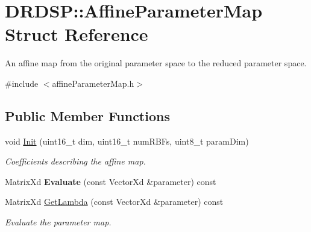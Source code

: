 \hypertarget{struct_d_r_d_s_p_1_1_affine_parameter_map}{\section{D\-R\-D\-S\-P\-:\-:Affine\-Parameter\-Map Struct Reference}
\label{struct_d_r_d_s_p_1_1_affine_parameter_map}
}


An affine map from the original parameter space to the reduced parameter space.  




{\ttfamily \#include $<$affine\-Parameter\-Map.\-h$>$}

\subsection*{Public Member Functions}
\begin{DoxyCompactItemize}
\item 
\hypertarget{struct_d_r_d_s_p_1_1_affine_parameter_map_a56991113d3a808ed701b1d1e10ebb3e0}{void \hyperlink{struct_d_r_d_s_p_1_1_affine_parameter_map_a56991113d3a808ed701b1d1e10ebb3e0}{Init} (uint16\-\_\-t dim, uint16\-\_\-t num\-R\-B\-Fs, uint8\-\_\-t param\-Dim)}\label{struct_d_r_d_s_p_1_1_affine_parameter_map_a56991113d3a808ed701b1d1e10ebb3e0}

\begin{DoxyCompactList}\small\item\em Coefficients describing the affine map. \end{DoxyCompactList}\item 
\hypertarget{struct_d_r_d_s_p_1_1_affine_parameter_map_a185c0b51a2ac97fadcfd137f8b35cd98}{Matrix\-Xd {\bfseries Evaluate} (const Vector\-Xd \&parameter) const }\label{struct_d_r_d_s_p_1_1_affine_parameter_map_a185c0b51a2ac97fadcfd137f8b35cd98}

\item 
\hypertarget{struct_d_r_d_s_p_1_1_affine_parameter_map_ae983bda2073bac0d8e6aebcc34d51153}{Matrix\-Xd \hyperlink{struct_d_r_d_s_p_1_1_affine_parameter_map_ae983bda2073bac0d8e6aebcc34d51153}{Get\-Lambda} (const Vector\-Xd \&parameter) const }\label{struct_d_r_d_s_p_1_1_affine_parameter_map_ae983bda2073bac0d8e6aebcc34d51153}

\begin{DoxyCompactList}\small\item\em Evaluate the parameter map. \end{DoxyCompactList}\end{DoxyCompactItemize}
